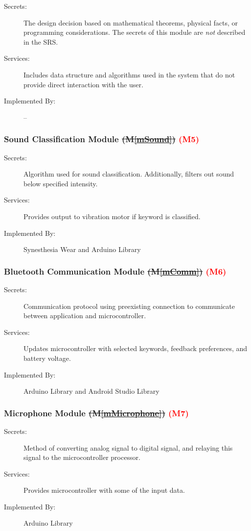 \documentclass[12pt, titlepage]{article}
\newcommand{\mref}[1]{M\ref{#1}}
\begin{document}
\begin{description}
\item[Secrets:] The design decision based on mathematical theorems, physical
  facts, or programming considerations. The secrets of this module are
  \emph{not} described in the SRS.
\item[Services:] Includes data structure and algorithms used in the system that
  do not provide direct interaction with the user. 
\item[Implemented By:] --
\end{description}

\subsubsection{Sound Classification Module \sout{(\mref{mSound})} \textcolor{red}{(M5)}}
\begin{description}
  \item[Secrets:] Algorithm used for sound classification. Additionally, filters out sound below specified intensity.
  \item[Services:] Provides output to vibration motor if keyword is classified.
  \item[Implemented By:] Synesthesia Wear and Arduino Library
  \end{description}

\subsubsection{Bluetooth Communication Module \sout{(\mref{mComm})} \textcolor{red}{(M6)}}
\begin{description}
  \item[Secrets:] Communication protocol using preexisting connection to communicate between application and microcontroller.
  \item[Services:] Updates microcontroller with selected keywords, feedback preferences, and battery voltage.
  \item[Implemented By:] Arduino Library and Android Studio Library
  \end{description}

\subsubsection{Microphone Module \sout{(\mref{mMicrophone})} \textcolor{red}{(M7)}}
\begin{description}
  \item[Secrets:] Method of converting analog signal to digital signal, and relaying this signal to the microcontroller processor.
  \item[Services:] Provides microcontroller with some of the input data.
  \item[Implemented By:] Arduino Library
  \end{description}
\end{document}
